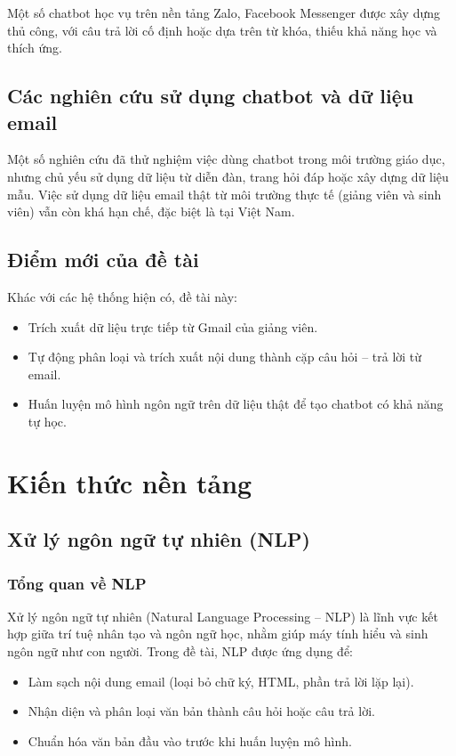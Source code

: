 \documentclass[../DoAn.tex]{subfiles}
\begin{document}
Một số chatbot học vụ trên nền tảng Zalo, Facebook Messenger được xây dựng thủ công, với câu trả lời cố định hoặc dựa trên từ khóa, thiếu khả năng học và thích ứng.

\subsection{Các nghiên cứu sử dụng chatbot và dữ liệu email}
Một số nghiên cứu đã thử nghiệm việc dùng chatbot trong môi trường giáo dục, nhưng chủ yếu sử dụng dữ liệu từ diễn đàn, trang hỏi đáp hoặc xây dựng dữ liệu mẫu. Việc sử dụng dữ liệu email thật từ môi trường thực tế (giảng viên và sinh viên) vẫn còn khá hạn chế, đặc biệt là tại Việt Nam.

\subsection{Điểm mới của đề tài}
Khác với các hệ thống hiện có, đề tài này:
\begin{itemize}
    \item Trích xuất dữ liệu trực tiếp từ Gmail của giảng viên.
    \item Tự động phân loại và trích xuất nội dung thành cặp câu hỏi – trả lời từ email.
    \item Huấn luyện mô hình ngôn ngữ trên dữ liệu thật để tạo chatbot có khả năng tự học.
\end{itemize}

\section{Kiến thức nền tảng}

\subsection{Xử lý ngôn ngữ tự nhiên (NLP)}

\subsubsection{Tổng quan về NLP}
Xử lý ngôn ngữ tự nhiên (Natural Language Processing – NLP) là lĩnh vực kết hợp giữa trí tuệ nhân tạo và ngôn ngữ học, nhằm giúp máy tính hiểu và sinh ngôn ngữ như con người. Trong đề tài, NLP được ứng dụng để:
\begin{itemize}
    \item Làm sạch nội dung email (loại bỏ chữ ký, HTML, phần trả lời lặp lại).
    \item Nhận diện và phân loại văn bản thành câu hỏi hoặc câu trả lời.
    \item Chuẩn hóa văn bản đầu vào trước khi huấn luyện mô hình.
\end{itemize}
\end{document}
